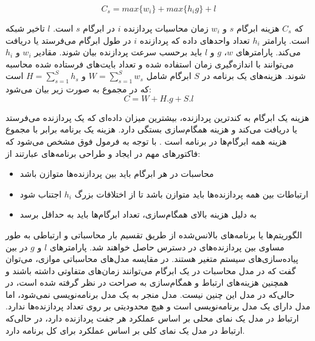 \begin{equation}\label{e4}
	C_s=max{\{w_i\}}+max{\{h_i g\}}+l
\end{equation}

که $C_s$ هزینه ابرگام $s$ و $w_i$ زمان محاسبات پردازنده $i$ در ابرگام $s$ است. $l$ تاخیر شبکه است. پارامتر $h_i$ تعداد واحدهای داده که پردازنده $i$ در طول ابرگام می‌فرستد یا دریافت می‌کند. پارامترهای $w$، $g$ و $l$ باید برحسب سرعت پردازنده بیان شوند. مقادیر $w_i$ و $h_i $ می‌توانند با اندازه‌گیری زمان استفاده شده و تعداد بایت‌های فرستاده شده محاسبه شوند. هزینه‌های یک برنامه  در $S$ ابرگام شامل $W=\sum_{s=1}^{S}w_s$ و $H=\sum_{s=1}^{S}h_s$ است که در مجموع به صورت زیر بیان می‌شود:
\begin{equation}\label{e5}
	C=W+H.g+S.l
\end{equation}

هزینه یک ابرگام به کندترین پردازنده، بیشترین میزان داده‌ای که یک پردازنده می‌فرستد یا دریافت می‌کند و هزینه همگام‌سازی بستگی دارد. هزینه یک برنامه  برابر با مجموع هزینه همه ابرگام‌ها در برنامه است \cite{Bisseling2020}. با توجه به فرمول فوق مشخص می‌شود که فاکتورهای مهم در ایجاد و طراحی برنامه‌های  عبارتند از:
\begin{itemize}
	\item 
	محاسبات در هر ابرگام باید بین پردازنده‌ها متوازن باشد
	\item
	ارتباطات بین همه پردازنده‌ها باید متوازن باشد تا از اختلافات بزرگ $h_i$ اجتناب شود
	\item 
	به دلیل هزینه بالای همگام‌سازی، تعداد ابرگام‌ها باید به حداقل برسد
\end{itemize}

الگوریتم‌ها یا برنامه‌های بالانس‌شده از طریق تقسیم بار محاسباتی و ارتباطی به طور مساوی بین پردازنده‌های در دسترس حاصل خواهند شد. پارامترهای $l$ و $g$ در بین پیاده‌سازی‌های سیستم متغیر هستند. در مقایسه مدل‌های محاسباتی موازی، می‌توان گفت که در مدل  محاسبات در یک ابرگام می‌توانند زمان‌های متفاوتی داشته باشند و همچنین هزینه‌های ارتباط و همگام‌سازی به صراحت در نظر گرفته شده است، در حالی‌که در مدل  این چنین نیست. مدل  منجر به یک مدل برنامه‌نویسی نمی‌شود، اما مدل  دارای یک مدل برنامه‌نویسی است و هیچ محدودیتی بر روی تعداد پردازنده‌ها ندارد. ارتباط در مدل  یک نمای محلی بر اساس عملکرد هر جفت پردازنده دارد، در حالی‌که ارتباط در مدل  یک نمای کلی بر اساس عملکرد برای کل برنامه دارد. 

